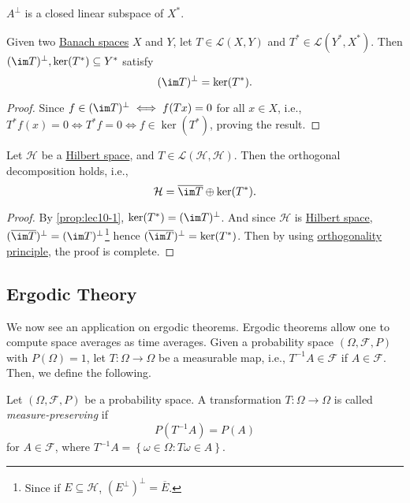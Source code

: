 \begin{note}
	\(A^\perp\) is a closed linear subspace of \(X^{\ast} \).
\end{note}

\begin{proposition}\label{prop:lec10-1}
	Given two  \hyperref[def:Banach-space]{Banach spaces} \(X\) and \(Y\), let \(T\in \mathcal{L} (X, Y)\) and \(T^{\ast} \in \mathcal{L} (Y^{\ast} , X^{\ast} )\). Then \((\im T)^\perp, \ker (T^{\ast} ) \subseteq Y^{\ast}\) satisfy
	\[
		(\im T)^\perp = \ker (T^{\ast} ).
	\]
\end{proposition}
\begin{proof}
	Since \(f\in (\im T)^\perp \iff f(Tx)= 0\) for all \(x\in X\), i.e., \(T^{\ast} f(x) = 0 \iff T^{\ast} f = 0\iff f\in \ker(T^{\ast})\), proving the result.
\end{proof}

\begin{corollary}
	Let \(\mathcal{H} \) be a \hyperref[def:Hilbert-space]{Hilbert space}, and \(T\in \mathcal{L} (\mathcal{H} , \mathcal{H} )\). Then the orthogonal decomposition holds, i.e.,
	\[
		\mathcal{H} = \overline{\im T}\oplus \ker (T^{\ast} ).
	\]
\end{corollary}
\begin{proof}
	By \autoref{prop:lec10-1}, \(\ker (T^{\ast} ) = (\im T)^\perp\). And since \(\mathcal{H}\) is \hyperref[def:Hilbert-space]{Hilbert space}, \((\overline{\im T})^{\perp}  = (\im T)^{\perp} \)\footnote{Since if \(E \subseteq \mathcal{H} \), \((E^\perp)^\perp = \overline{E}\).} hence \((\overline{\im T})^{\perp} = \ker (T^{\ast}) \). Then by using \hyperref[thm:orthogonality-principle]{orthogonality principle}, the proof is complete.
\end{proof}

\subsection{Ergodic Theory}
We now see an application on ergodic theorems. Ergodic theorems allow one to compute space averages as time averages. Given a probability space \((\Omega , \mathcal{F} , P)\) with \(P(\Omega ) = 1\), let \(T\colon \Omega \to \Omega \) be a measurable map, i.e., \(T^{-1} A \in \mathcal{F} \) if \(A\in \mathcal{F} \). Then, we define the following.

\begin{definition}\label{def:measure-preserving}
	Let \((\Omega , \mathcal{F} , P)\) be a probability space. A transformation \(T\colon \Omega \to \Omega \) is called \emph{measure-preserving} if
	\[
		P(T^{-1} A) = P(A)
	\]
	for \(A\in \mathcal{F} \), where \(T^{-1} A = \left\{ \omega \in \Omega \colon T \omega \in A \right\} \).
\end{definition}

